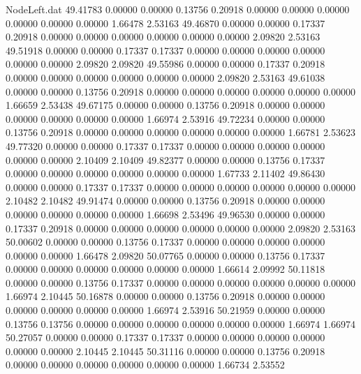 \begin{filecontents}{NodeLeft.dat}
  49.41783    0.00000    0.00000     0.13756    0.20918    0.00000    0.00000    0.00000    0.00000    0.00000    0.00000    1.66478    2.53163
  49.46870    0.00000    0.00000     0.17337    0.20918    0.00000    0.00000    0.00000    0.00000    0.00000    0.00000    2.09820    2.53163
  49.51918    0.00000    0.00000     0.17337    0.17337    0.00000    0.00000    0.00000    0.00000    0.00000    0.00000    2.09820    2.09820
  49.55986    0.00000    0.00000     0.17337    0.20918    0.00000    0.00000    0.00000    0.00000    0.00000    0.00000    2.09820    2.53163
  49.61038    0.00000    0.00000     0.13756    0.20918    0.00000    0.00000    0.00000    0.00000    0.00000    0.00000    1.66659    2.53438
  49.67175    0.00000    0.00000     0.13756    0.20918    0.00000    0.00000    0.00000    0.00000    0.00000    0.00000    1.66974    2.53916
  49.72234    0.00000    0.00000     0.13756    0.20918    0.00000    0.00000    0.00000    0.00000    0.00000    0.00000    1.66781    2.53623
  49.77320    0.00000    0.00000     0.17337    0.17337    0.00000    0.00000    0.00000    0.00000    0.00000    0.00000    2.10409    2.10409
  49.82377    0.00000    0.00000     0.13756    0.17337    0.00000    0.00000    0.00000    0.00000    0.00000    0.00000    1.67733    2.11402
  49.86430    0.00000    0.00000     0.17337    0.17337    0.00000    0.00000    0.00000    0.00000    0.00000    0.00000    2.10482    2.10482
  49.91474    0.00000    0.00000     0.13756    0.20918    0.00000    0.00000    0.00000    0.00000    0.00000    0.00000    1.66698    2.53496
  49.96530    0.00000    0.00000     0.17337    0.20918    0.00000    0.00000    0.00000    0.00000    0.00000    0.00000    2.09820    2.53163
  50.00602    0.00000    0.00000     0.13756    0.17337    0.00000    0.00000    0.00000    0.00000    0.00000    0.00000    1.66478    2.09820
  50.07765    0.00000    0.00000     0.13756    0.17337    0.00000    0.00000    0.00000    0.00000    0.00000    0.00000    1.66614    2.09992
  50.11818    0.00000    0.00000     0.13756    0.17337    0.00000    0.00000    0.00000    0.00000    0.00000    0.00000    1.66974    2.10445
  50.16878    0.00000    0.00000     0.13756    0.20918    0.00000    0.00000    0.00000    0.00000    0.00000    0.00000    1.66974    2.53916
  50.21959    0.00000    0.00000     0.13756    0.13756    0.00000    0.00000    0.00000    0.00000    0.00000    0.00000    1.66974    1.66974
  50.27057    0.00000    0.00000     0.17337    0.17337    0.00000    0.00000    0.00000    0.00000    0.00000    0.00000    2.10445    2.10445
  50.31116    0.00000    0.00000     0.13756    0.20918    0.00000    0.00000    0.00000    0.00000    0.00000    0.00000    1.66734    2.53552

\end{filecontents}
